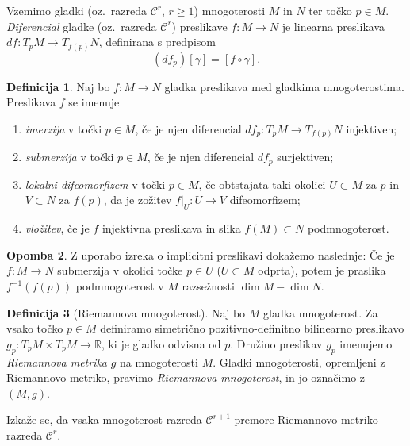 \documentclass[12pt,a4paper,twoside]{article}
\theoremstyle{definition} %
\newtheorem{definicija}{Definicija}[section]
\newtheorem{opomba}[definicija]{Opomba}
\theoremstyle{plain} %
\numberwithin{equation}{section}  %
\newcommand{\R}{\mathbb R}
\begin{document}
Vzemimo gladki (oz.~razreda $\mathcal{C}^{r}$, $r \geq 1$) mnogoterosti $M$ in $N$ ter točko $p \in M$. \emph{Diferencial} gladke (oz.~razreda $\mathcal{C}^{r}$) preslikave $f \colon M \to N$ je linearna preslikava $df \colon T_{p}M \to T_{f(p)}N$, definirana s predpisom
\begin{equation}
(df_{p})[\gamma] = [f \circ \gamma].
\end{equation}

\begin{definicija}
Naj bo $f \colon M \to N$ gladka preslikava med gladkima mnogoterostima. Preslikava $f$ se imenuje 
\begin{enumerate}
\item \emph{imerzija} v točki $p \in M$, če je njen diferencial $df_{p} \colon T_{p}M \to T_{f(p)}N$ injektiven;
\item \emph{submerzija} v točki $p \in M$, če je njen diferencial $df_{p}$ surjektiven;
\item \emph{lokalni difeomorfizem} v točki $p \in M$, če obtstajata taki okolici $U \subset M$ za $p$ in $V \subset N$ za $f(p)$, da je zožitev $f|_{U} \colon U \to V$ difeomorfizem;
\item \emph{vložitev}, če je $f$ injektivna preslikava in slika $f(M) \subset N$ podmnogoterost.
\end{enumerate}
\end{definicija}

\begin{opomba}
Z uporabo izreka o implicitni preslikavi dokažemo naslednje: Če je $f \colon M \to N$ submerzija v okolici točke $p \in U$ ($U \subset M$ odprta), potem je praslika $f^{-1}(f(p))$ podmnogoterost v $M$ razsežnosti $\dim M - \dim N$.
\end{opomba}

\begin{definicija} [Riemannova mnogoterost]
Naj bo $M$ gladka mnogoterost. Za vsako točko $p \in M$ definiramo simetrično pozitivno-definitno bilinearno preslikavo $g_{p} \colon T_{p}M \times T_{p}M \to \R$, ki je gladko odvisna od $p$. Družino preslikav $g_{p}$ imenujemo \emph{Riemannova metrika} $g$ na mnogoterosti $M$.
Gladki mnogoterosti, opremljeni z Riemannovo metriko, pravimo \emph{Riemannova mnogoterost}, in jo označimo z $(M,g)$.
\end{definicija}

Izkaže se, da vsaka mnogoterost razreda $\mathcal{C}^{r+1}$ premore Riemannovo metriko razreda $\mathcal{C}^{r}$.
\end{document}
